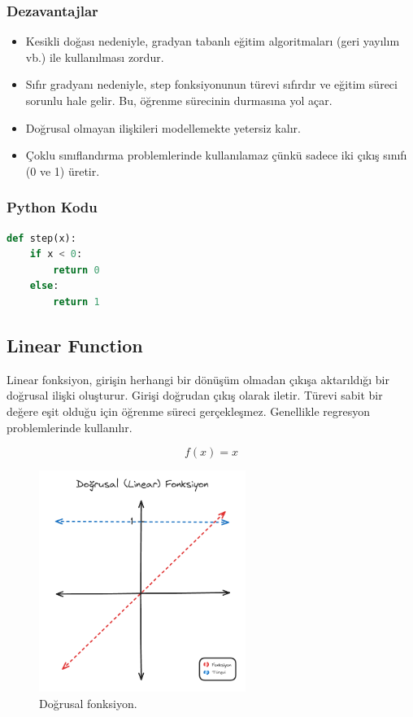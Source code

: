 \subsubsection{Dezavantajlar}
\begin{itemize}
    \item Kesikli doğası nedeniyle, gradyan tabanlı eğitim algoritmaları (geri yayılım vb.) ile kullanılması zordur.
    \item Sıfır gradyanı nedeniyle, step fonksiyonunun türevi sıfırdır ve eğitim süreci sorunlu hale gelir. Bu, öğrenme sürecinin durmasına yol açar.
    \item Doğrusal olmayan ilişkileri modellemekte yetersiz kalır.
    \item Çoklu sınıflandırma problemlerinde kullanılamaz çünkü sadece iki çıkış sınıfı (0 ve 1) üretir.
\end{itemize}

\subsubsection{Python Kodu}

\begin{lstlisting}[language=Python]
def step(x):
    if x < 0:
        return 0
    else:
        return 1
\end{lstlisting}

\newpage

\subsection{Linear Function}
Linear fonksiyon, girişin herhangi bir dönüşüm olmadan çıkışa aktarıldığı bir doğrusal ilişki oluşturur. Girişi doğrudan çıkış olarak iletir. Türevi sabit bir değere eşit olduğu için öğrenme süreci gerçekleşmez. Genellikle regresyon problemlerinde kullanılır.

\[f(x) = x\]

\begin{figure}[h]
    \centering
    \includegraphics[width=0.6\textwidth]{images/linear_function.png}
    \caption{Doğrusal fonksiyon.}
    \label{fig:enter-label}
\end{figure}

